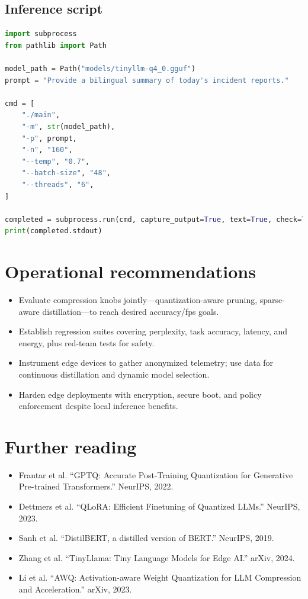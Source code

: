 \documentclass{article}
\begin{document}
\subsection{Inference script}
\begin{lstlisting}[language=Python,caption={Running a quantized TinyLLM model with llama.cpp}]
import subprocess
from pathlib import Path

model_path = Path("models/tinyllm-q4_0.gguf")
prompt = "Provide a bilingual summary of today's incident reports."

cmd = [
    "./main",
    "-m", str(model_path),
    "-p", prompt,
    "-n", "160",
    "--temp", "0.7",
    "--batch-size", "48",
    "--threads", "6",
]

completed = subprocess.run(cmd, capture_output=True, text=True, check=True)
print(completed.stdout)
\end{lstlisting}

\section*{Operational recommendations}
\begin{itemize}
  \item Evaluate compression knobs jointly—quantization-aware pruning, sparse-aware distillation—to reach desired accuracy/fps goals.
  \item Establish regression suites covering perplexity, task accuracy, latency, and energy, plus red-team tests for safety.
  \item Instrument edge devices to gather anonymized telemetry; use data for continuous distillation and dynamic model selection.
  \item Harden edge deployments with encryption, secure boot, and policy enforcement despite local inference benefits.
\end{itemize}

\section*{Further reading}
\begin{itemize}
  \item Frantar et al. ``GPTQ: Accurate Post-Training Quantization for Generative Pre-trained Transformers.'' NeurIPS, 2022.
  \item Dettmers et al. ``QLoRA: Efficient Finetuning of Quantized LLMs.'' NeurIPS, 2023.
  \item Sanh et al. ``DistilBERT, a distilled version of BERT.'' NeurIPS, 2019.
  \item Zhang et al. ``TinyLlama: Tiny Language Models for Edge AI.'' arXiv, 2024.
  \item Li et al. ``AWQ: Activation-aware Weight Quantization for LLM Compression and Acceleration.'' arXiv, 2023.
\end{itemize}
\end{document}

